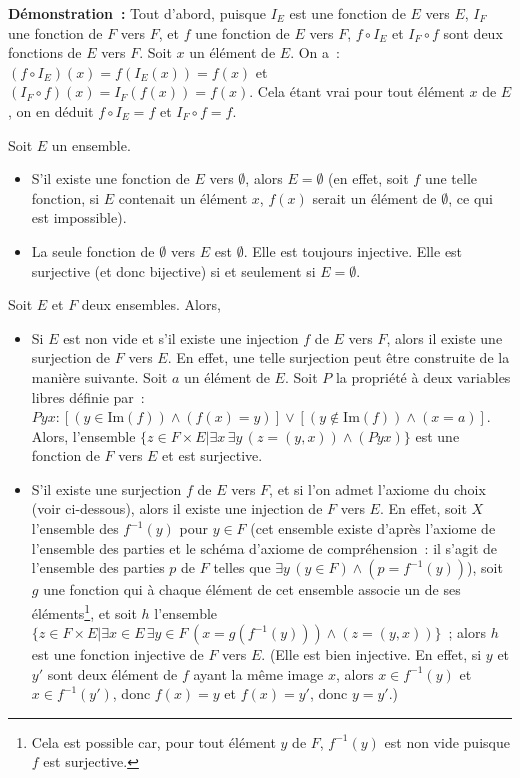 \medskip

\noindent\textbf{Démonstration :} 
    Tout d'abord, puisque $I_E$ est une fonction de $E$ vers $E$, $I_F$ une fonction de $F$ vers $F$, et $f$ une fonction de $E$ vers $F$, $f \circ I_E$ et $I_F \circ f$ sont deux fonctions de $E$ vers $F$. 
    Soit $x$ un élément de $E$. 
    On a : $(f \circ I_E)(x) = f(I_E(x)) = f(x)$ et $(I_F \circ f)(x) = I_F(f(x)) = f(x)$.
    Cela étant vrai pour tout élément $x$ de $E$, on en déduit $f \circ I_E = f$ et $I_F \circ f = f$.

   \done 

\medskip

Soit $E$ un ensemble. 
\begin{itemize}[nosep]
    \item S'il existe une fonction de $E$ vers $\emptyset$, alors $E = \emptyset$ (en effet, soit $f$ une telle fonction, si $E$ contenait un élément $x$, $f(x)$ serait un élément de $\emptyset$, ce qui est impossible).
    \item La seule fonction de $\emptyset$ vers $E$ est $\emptyset$. 
        Elle est toujours injective. 
        Elle est surjective (et donc bijective) si et seulement si $E = \emptyset$.
\end{itemize}

\medskip

Soit $E$ et $F$ deux ensembles. 
Alors, 
\begin{itemize}
    \item Si $E$ est non vide et s'il existe une injection $f$ de $E$ vers $F$, alors il existe une surjection de $F$ vers $E$. 
        En effet, une telle surjection peut être construite de la manière suivante. 
        Soit $a$ un élément de $E$.
        Soit $P$ la propriété à deux variables libres définie par : $P y x: [(y \in \mathrm{Im}(f)) \wedge (f(x) = y)] \vee [(y \notin \mathrm{Im}(f)) \wedge (x = a)]$. 
        Alors, l'ensemble $\lbrace z \in F \times E \vert \exists x \, \exists y \, (z = (y,x)) \wedge (P y x) \rbrace$ est une fonction de $F$ vers $E$ et est surjective.
    \item S'il existe une surjection $f$ de $E$ vers $F$, et si l'on admet l'axiome du choix (voir ci-dessous), alors il existe une injection de $F$ vers $E$. 
        En effet, soit $X$ l'ensemble des $f^{-1}(y)$ pour $y \in F$ (cet ensemble existe d'après l'axiome de l'ensemble des parties et le schéma d'axiome de compréhension : il s'agit de l'ensemble des parties $p$ de $F$ telles que $\exists y \, (y \in F) \wedge (p = f^{-1}(y))$), soit $g$ une fonction qui à chaque élément de cet ensemble associe un de ses éléments\footnote{Cela est possible car, pour tout élément $y$ de $F$, $f^{-1}(y)$ est non vide puisque $f$ est surjective.}, et soit $h$ l'ensemble $\lbrace z \in F \times E \vert \exists x \in E \, \exists y \in F \, (x = g(f^{-1}(y))) \wedge (z=(y,x)) \rbrace$ ; alors $h$ est une fonction injective de $F$ vers $E$. (Elle est bien injective. En effet, si $y$ et $y'$ sont deux élément de $f$ ayant la même image $x$, alors $x \in f^{-1}(y)$ et $x \in f^{-1}(y')$, donc $f(x) = y$ et $f(x) = y'$, donc $y=y'$.)
\end{itemize}

